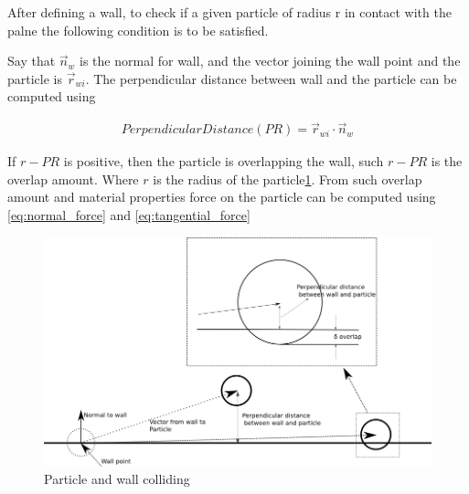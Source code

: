 After defining a wall, to check if a given particle of radius r in
contact with the palne the following condition is to be satisfied.

Say that $\vec{n}_w$ is the normal for wall, and the vector joining
the wall point and the particle is $\vec{r}_{wi}$. The perpendicular
distance between wall and the particle can be computed using

\begin{align}
  \label{eq:perpendicular_dist}
    Perpendicular Distance(PR) =  \vec{r}_{wi} \cdot  \vec{n}_w
\end{align}

If $r - PR $ is positive, then the particle is overlapping the wall,
such $r - PR$ is the overlap amount. Where $r$ is the radius of the
particle\ref{fig:particle_wall_collision}. From such overlap amount
and material properties force on the particle can be computed using
\eqref{eq:normal_force} and \eqref{eq:tangential_force}

\begin{figure}
  \centering
  \includegraphics[scale=1.5]{dem/particle_wall_collision.png}
  \caption{Particle and wall colliding}
  \label{fig:particle_wall_collision}
\end{figure}




